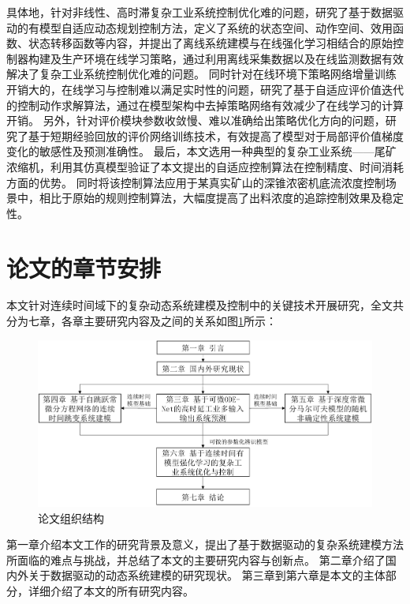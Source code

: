 具体地，针对非线性、高时滞复杂工业系统控制优化难的问题，研究了基于数据驱动的有模型自适应动态规划控制方法，定义了系统的状态空间、动作空间、效用函数、状态转移函数等内容，并提出了离线系统建模与在线强化学习相结合的原始控制器构建及生产环境在线学习策略，通过利用离线采集数据以及在线监测数据有效解决了复杂工业系统控制优化难的问题。
同时针对在线环境下策略网络增量训练开销大的，在线学习与控制难以满足实时性的问题，研究了基于自适应评价值迭代的控制动作求解算法，通过在模型架构中去掉策略网络有效减少了在线学习的计算开销。
另外，针对评价模块参数收敛慢、难以准确给出策略优化方向的问题，研究了基于短期经验回放的评价网络训练技术，有效提高了模型对于局部评价值梯度变化的敏感性及预测准确性。
最后，本文选用一种典型的复杂工业系统——尾矿浓缩机，利用其仿真模型验证了本文提出的自适应控制算法在控制精度、时间消耗方面的优势。
同时将该控制算法应用于某真实矿山的深锥浓密机底流浓度控制场景中，相比于原始的规则控制算法，大幅度提高了出料浓度的追踪控制效果及稳定性。

\section{论文的章节安排}

本文针对连续时间域下的复杂动态系统建模及控制中的关键技术开展研究，全文共分为七章，各章主要研究内容及之间的关系如图\ref{fig:structure}所示：
\begin{figure}
    \centering
    \includegraphics[width=0.95\linewidth]{figures/chapter1/structure.pdf}
    \caption{论文组织结构}
    \label{fig:structure}
\end{figure}

第一章介绍本文工作的研究背景及意义，提出了基于数据驱动的复杂系统建模方法所面临的难点与挑战，并总结了本文的主要研究内容与创新点。
第二章介绍了国内外关于数据驱动的动态系统建模的研究现状。
第三章到第六章是本文的主体部分，详细介绍了本文的所有研究内容。


